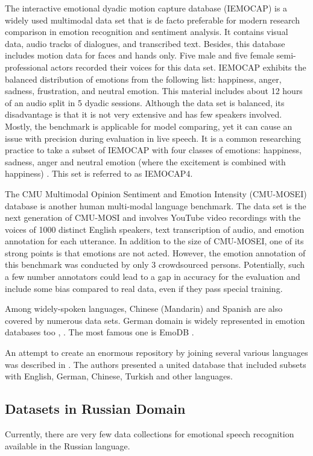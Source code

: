 \documentclass{article}
\begin{document}
The interactive emotional dyadic motion capture database (IEMOCAP) \cite{iemocap} is a widely used multimodal data set that is de facto preferable for modern research comparison in emotion recognition and sentiment analysis. It contains visual data, audio tracks of dialogues, and transcribed text. Besides, this database includes motion data for faces and hands only. Five male and five female semi-professional actors recorded their voices for this data set. IEMOCAP exhibits the balanced distribution of emotions from the following list: happiness, anger, sadness, frustration, and neutral emotion. This material includes about 12 hours of an audio split in 5 dyadic sessions. Although the data set is balanced, its disadvantage is that it is not very extensive and has few speakers involved. Mostly, the benchmark is applicable for model comparing, yet it can cause an issue with precision during evaluation in live speech. 
It is a common researching practice to take a subset of IEMOCAP with four classes of emotions: happiness, sadness, anger and neutral emotion (where the excitement is combined with happiness) \cite{milner2019cross}. This set is referred to as IEMOCAP4.

The CMU Multimodal Opinion Sentiment and Emotion Intensity (CMU-MOSEI) database \cite{cmumosei} is another human multi-modal language benchmark. The data set is the next generation of CMU-MOSI \cite{mosi} and involves YouTube video recordings with the voices of 1000 distinct English speakers, text transcription of audio, and emotion annotation for each utterance. In addition to the size of CMU-MOSEI, one of its strong points is that emotions are not acted. However, the emotion annotation of this benchmark was conducted by only 3 crowdsourced persons. Potentially, such a few number annotators could lead to a gap in accuracy for the evaluation and include some bias compared to real data, even if they pass special training.

Among widely-spoken languages, Chinese (Mandarin) and Spanish are also covered by numerous data sets. German domain is widely represented in emotion databases too \cite{german2}, \cite{german3}. The most famous one is EmoDB \cite{emodb}.

An attempt to create an enormous repository by joining several various languages was described in \cite{emonet}. The authors presented a united database that included subsets with English, German, Chinese, Turkish and other languages.

\subsection{Datasets in Russian Domain}
Currently, there are very few data collections for emotional speech recognition available in the Russian language.
\end{document}
